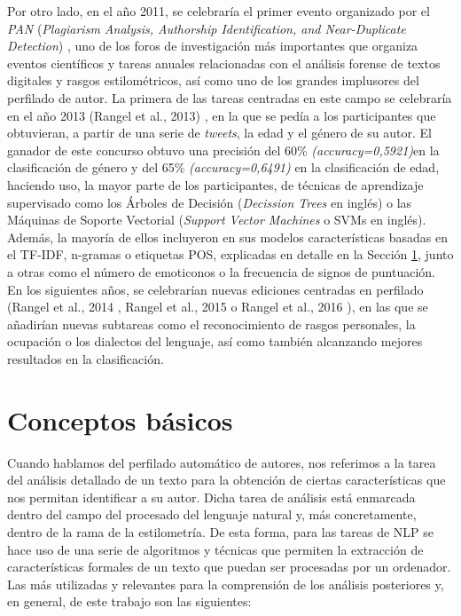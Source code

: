 \bigskip
Por otro lado, en el año 2011, se celebraría el primer evento organizado por el \textit{PAN} (\textit{Plagiarism Analysis, Authorship Identification, and Near-Duplicate Detection}) \cite{pan},
uno de los foros de investigación más importantes que organiza eventos científicos y tareas anuales relacionadas con el análisis forense de textos digitales
y rasgos estilométricos, así como uno de los grandes implusores del perfilado de autor. La primera de las tareas centradas en este campo se celebraría en el año 2013 (Rangel et al., 2013) \cite{rangel2013overview},
en la que se pedía a los participantes que obtuvieran, a partir de una serie de \textit{tweets}, la edad y el género de su autor. El ganador de este concurso obtuvo una
precisión del 60\% \textit{(accuracy=0,5921)}en la clasificación de género y del 65\% \textit{(accuracy=0,6491)} en la clasificación de edad, haciendo uso, la mayor parte de los participantes, de técnicas de aprendizaje
supervisado como los Árboles de Decisión (\textit{Decission Trees} en inglés) o las Máquinas de Soporte Vectorial (\textit{Support Vector Machines} o SVMs en inglés).
Además, la mayoría de ellos incluyeron en sus modelos características basadas en el TF-IDF, n-gramas o etiquetas POS, explicadas en detalle en la Sección \ref{sec:conceptos_basicos},
junto a otras como el número de emoticonos o la frecuencia de signos de puntuación.
En los siguientes años, se celebrarían nuevas ediciones centradas en perfilado (Rangel et al., 2014 \cite{rangel2014overview}, Rangel et al., 2015 \cite{rangel2015overview} o
Rangel et al., 2016 \cite{rangel2016overview}), en las que se añadirían nuevas subtareas como el reconocimiento de rasgos personales, la ocupación o los dialectos del lenguaje,
así como también alcanzando mejores resultados en la clasificación.

\section{Conceptos básicos}
\label{sec:conceptos_basicos}

Cuando hablamos del perfilado automático de autores, nos referimos a la tarea del análisis detallado de un texto para la obtención de ciertas características
que nos permitan identificar a su autor.
Dicha tarea de análisis está enmarcada dentro del campo del procesado del lenguaje natural y, más concretamente,
dentro de la rama de la estilometría. De esta forma, para las tareas de NLP se hace uso
de una serie de algoritmos y técnicas que permiten la extracción de características formales de un texto que puedan
ser procesadas por un ordenador. Las más utilizadas y relevantes
para la comprensión de los análisis posteriores y, en general, de este trabajo son las siguientes:

